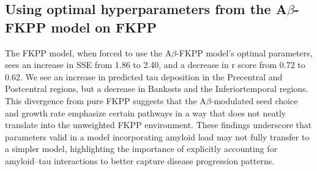 \subsection{Using optimal hyperparameters from the A$\beta$-FKPP model on FKPP}
The FKPP model, when forced to use the A$\beta$-FKPP model’s optimal parameters, sees an increase in SSE from 1.86 to 2.40, and a decrease in r score from 0.72 to 0.62.
We see an increase in predicted tau deposition in the Precentral and Postcentral regions, but a decrease in Bankssts and the Inferiortemporal regions. This divergence from pure FKPP suggests that the A$\beta$-modulated seed choice and growth rate emphasize certain pathways in a way that does not neatly translate into the unweighted FKPP environment. These findings underscore that parameters valid in a model incorporating amyloid load may not fully transfer to a simpler model, highlighting the importance of explicitly accounting for amyloid–tau interactions to better capture disease progression patterns.

